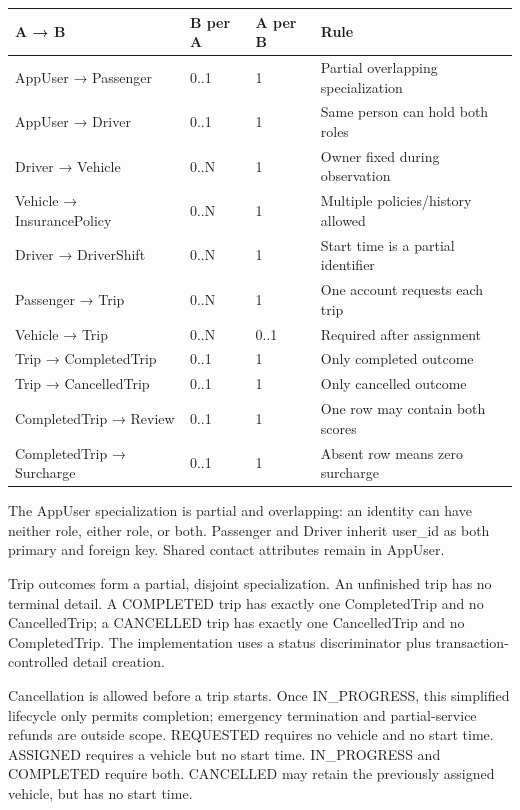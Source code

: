 \documentclass[11pt,a4paper]{article}
\begin{document}
\par\begingroup\small\noindent
\begin{tabularx}{\linewidth}{p{4.3cm}p{1.3cm}p{1.3cm}X}
\toprule
A → B & B per A & A per B & Rule\\\midrule
AppUser → Passenger & 0..1 & 1 & Partial overlapping specialization\\
AppUser → Driver & 0..1 & 1 & Same person can hold both roles\\
Driver → Vehicle & 0..N & 1 & Owner fixed during observation\\
Vehicle → InsurancePolicy & 0..N & 1 & Multiple policies/history allowed\\
Driver → DriverShift & 0..N & 1 & Start time is a partial identifier\\
Passenger → Trip & 0..N & 1 & One account requests each trip\\
Vehicle → Trip & 0..N & 0..1 & Required after assignment\\
Trip → CompletedTrip & 0..1 & 1 & Only completed outcome\\
Trip → CancelledTrip & 0..1 & 1 & Only cancelled outcome\\
CompletedTrip → Review & 0..1 & 1 & One row may contain both scores\\
CompletedTrip → Surcharge & 0..1 & 1 & Absent row means zero surcharge\\
\bottomrule
\end{tabularx}
\par\endgroup

The AppUser specialization is partial and overlapping: an identity can have neither role, either role, or both. Passenger and Driver inherit user\_\allowbreak{}id as both primary and foreign key. Shared contact attributes remain in AppUser.

Trip outcomes form a partial, disjoint specialization. An unfinished trip has no terminal detail. A COMPLETED trip has exactly one CompletedTrip and no CancelledTrip; a CANCELLED trip has exactly one CancelledTrip and no CompletedTrip. The implementation uses a status discriminator plus transaction-controlled detail creation.

Cancellation is allowed before a trip starts. Once IN\_\allowbreak{}PROGRESS, this simplified lifecycle only permits completion; emergency termination and partial-service refunds are outside scope. REQUESTED requires no vehicle and no start time. ASSIGNED requires a vehicle but no start time. IN\_\allowbreak{}PROGRESS and COMPLETED require both. CANCELLED may retain the previously assigned vehicle, but has no start time.
\end{document}
